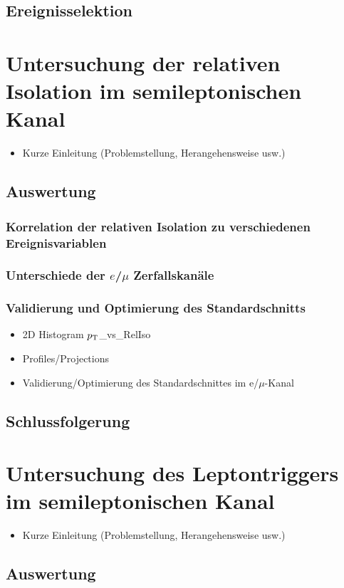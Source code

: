 \documentclass[12pt,a4paper]{article}
\newcommand{\pt}{$p_{\text T}$}
\begin{document}
\subsection{Ereignisselektion}
\section{Untersuchung der relativen Isolation im semileptonischen Kanal}
\begin{itemize}
\item Kurze Einleitung (Problemstellung, Herangehensweise usw.)
\end{itemize}
\subsection{Auswertung}
\subsubsection{Korrelation der relativen Isolation zu verschiedenen Ereignisvariablen}
\subsubsection{Unterschiede der $e$/$\mu$ Zerfallskanäle}
\subsubsection{Validierung und Optimierung des Standardschnitts}
\begin{itemize}
\item 2D Histogram \pt \_vs\_RelIso
\item Profiles/Projections
\item Validierung/Optimierung des Standardschnittes im e/$\mu$-Kanal
\end{itemize}
\subsection{Schlussfolgerung}
\section{Untersuchung des Leptontriggers im semileptonischen Kanal}
\begin{itemize}
\item Kurze Einleitung (Problemstellung, Herangehensweise usw.)
\end{itemize}
\subsection{Auswertung}
\end{document}
